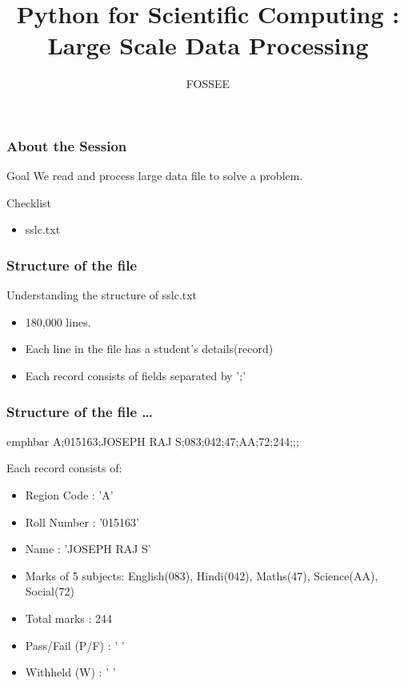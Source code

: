\documentclass[14pt,compress]{beamer}
\title{Python for Scientific Computing : Large Scale Data Processing}
\author[FOSSEE] {FOSSEE}
\institute[IIT Bombay] {Department of Aerospace Engineering\\IIT Bombay}
\date{}
\newcommand{\emphbar}[1]
{\begin{beamercolorbox}[rounded=true]{emphbar} 
      {#1}
 \end{beamercolorbox}
}
\begin{document}
\begin{frame}
  \maketitle
\end{frame}

\begin{frame}
  \frametitle{About the Session}
  \begin{block}{Goal}
    We read and process large data file to solve a problem.
  \end{block}
  \begin{block}{Checklist}
    \begin{itemize}
    \item sslc.txt
  \end{itemize}
  \end{block}
\end{frame}

\begin{frame}
  \frametitle{Structure of the file}
  Understanding the structure of sslc.txt
  \begin{itemize}
    \item 180,000 lines. 
    \item Each line in the file has a student's details(record)
    \item Each record consists of fields separated by ';'
  \end{itemize}
\end{frame}

\begin{frame}
  \frametitle{Structure of the file \ldots}
\emphbar{A;015163;JOSEPH RAJ S;083;042;47;AA;72;244;;;}
  Each record consists of:
  \begin{itemize}
    \item Region Code : 'A'
    \item Roll Number : '015163'
    \item Name : 'JOSEPH RAJ S'
    \item Marks of 5 subjects: English(083), Hindi(042), Maths(47), Science(AA), Social(72)
    \item Total marks : 244
    \item Pass/Fail (P/F) : ' '
    \item Withheld (W) : ' '
  \end{itemize}
\end{frame}

\end{document}
